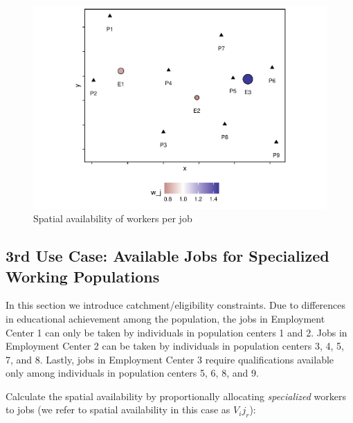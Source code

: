 \documentclass[]{elsarticle} %
\begin{document}
\begin{figure}
\includegraphics[width=1\linewidth]{Spatial-Availability_files/figure-latex/toy-example-availability-workers-per-job-1} \caption{\label{fig:toy-example-availability-workers-per-job}Spatial availability of workers per job}\label{fig:toy-example-availability-workers-per-job}
\end{figure}

\hypertarget{rd-use-case-available-jobs-for-specialized-working-populations}{%
\subsection{3rd Use Case: Available Jobs for Specialized Working
Populations}\label{rd-use-case-available-jobs-for-specialized-working-populations}}

In this section we introduce catchment/eligibility constraints. Due to
differences in educational achievement among the population, the jobs in
Employment Center 1 can only be taken by individuals in population
centers 1 and 2. Jobs in Employment Center 2 can be taken by individuals
in population centers 3, 4, 5, 7, and 8. Lastly, jobs in Employment
Center 3 require qualifications available only among individuals in
population centers 5, 6, 8, and 9.

Calculate the spatial availability by proportionally allocating
\emph{specialized} workers to jobs (we refer to spatial availability in
this case as \(V_ij_r\)):
\end{document}
